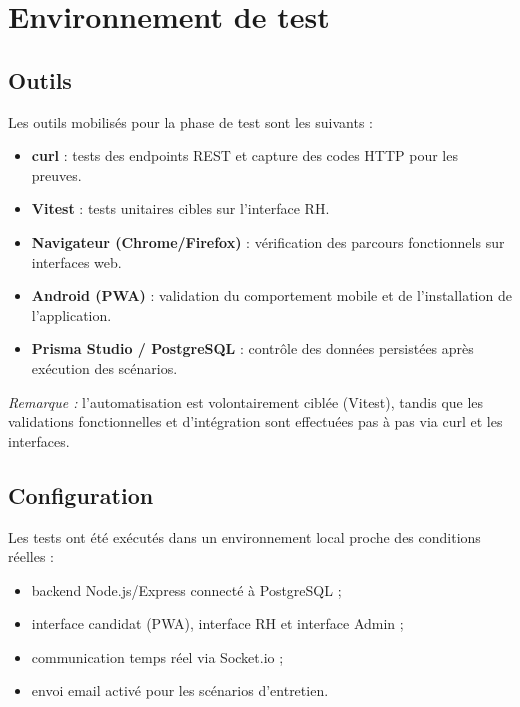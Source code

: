 \section{Environnement de test}

\subsection{Outils}

Les outils mobilisés pour la phase de test sont les suivants :
\begin{itemize}
    \item \textbf{curl} : tests des endpoints REST et capture des codes
    HTTP pour les preuves.
    \item \textbf{Vitest} : tests unitaires cibles sur l'interface RH.
    \item \textbf{Navigateur (Chrome/Firefox)} : vérification des parcours
    fonctionnels sur interfaces web.
    \item \textbf{Android (PWA)} : validation du comportement mobile et de
    l'installation de l'application.
    \item \textbf{Prisma Studio / PostgreSQL} : contrôle des données
    persistées après exécution des scénarios.
\end{itemize}

\textit{Remarque :} l'automatisation est volontairement ciblée (Vitest),
tandis que les validations fonctionnelles et d'intégration sont effectuées
pas à pas via curl et les interfaces.

\subsection{Configuration}

Les tests ont été exécutés dans un environnement local proche des conditions
réelles :
\begin{itemize}
    \item backend Node.js/Express connecté à PostgreSQL ;
    \item interface candidat (PWA), interface RH et interface Admin ;
    \item communication temps réel via Socket.io ;
    \item envoi email activé pour les scénarios d'entretien.
\end{itemize}


